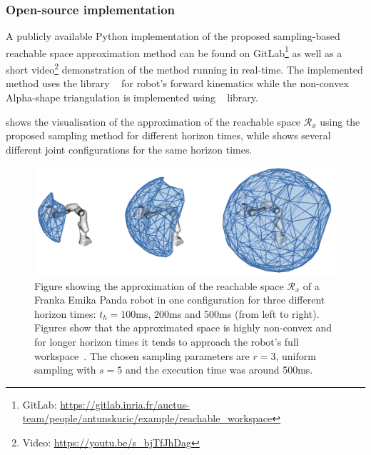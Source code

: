 \subsubsection*{Open-source implementation}
A publicly available Python implementation of the proposed sampling-based reachable space approximation method can be found on GitLab\footnote{GitLab: \url{https://gitlab.inria.fr/auctus-team/people/antunskuric/example/reachable_workspace}} as well as a short video\footnote{Video: \url{https://youtu.be/s_bjTfJhDag}} demonstration of the method running in real-time. The implemented method uses the library ~\cite{pinocchio2021} for robot's forward kinematics while the non-convex Alpha-shape triangulation is implemented using ~\cite{cgal3Dalpha} library.

 shows the visualisation of the approximation of the reachable space $\mathcal{R}_x$ using the proposed sampling method for different horizon times, while  shows several different joint configurations for the same horizon times.


\begin{figure}[!h]
    \centering
    \includegraphics[width=\textwidth]{Papers/images/horizon_nonlinear.png}
    \caption{Figure showing the approximation of the reachable space $\mathcal{R}_x$ of a Franka Emika Panda robot in one configuration for three different horizon times: $t_h=100$ms, $200$ms and $500$ms (from left to right). Figures show that the approximated space is highly non-convex and for longer horizon times it tends to approach the robot's full workspace~\cite{franka_maual}.  The chosen sampling parameters are $r=3$, uniform sampling with $s=5$ and the execution time was around 500ms.}
    \label{fig:curved_space_algo_new_real_panda}
\end{figure}

